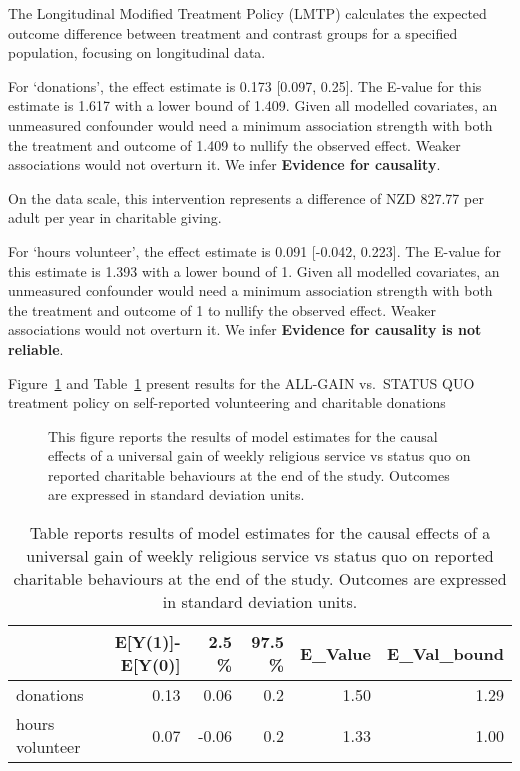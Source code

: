 \documentclass[
  single column]{article}
\begin{document}
The Longitudinal Modified Treatment Policy (LMTP) calculates the
expected outcome difference between treatment and contrast groups for a
specified population, focusing on longitudinal data.

For `donations', the effect estimate is 0.173 {[}0.097, 0.25{]}. The
E-value for this estimate is 1.617 with a lower bound of 1.409. Given
all modelled covariates, an unmeasured confounder would need a minimum
association strength with both the treatment and outcome of 1.409 to
nullify the observed effect. Weaker associations would not overturn it.
We infer \textbf{Evidence for causality}.

On the data scale, this intervention represents a difference of NZD
827.77 per adult per year in charitable giving.

For `hours volunteer', the effect estimate is 0.091 {[}-0.042, 0.223{]}.
The E-value for this estimate is 1.393 with a lower bound of 1. Given
all modelled covariates, an unmeasured confounder would need a minimum
association strength with both the treatment and outcome of 1 to nullify
the observed effect. Weaker associations would not overturn it. We infer
\textbf{Evidence for causality is not reliable}.

\newpage{}

Figure~\ref{fig-1_2} and Table~\ref{tbl-1_2} present results for the
ALL-GAIN vs.~STATUS QUO treatment policy on self-reported volunteering
and charitable donations

\begin{figure}


\caption{\label{fig-1_2}This figure reports the results of model
estimates for the causal effects of a universal gain of weekly religious
service vs status quo on reported charitable behaviours at the end of
the study. Outcomes are expressed in standard deviation units.}

\end{figure}%

\begin{longtable}[]{@{}lrrrrr@{}}

\caption{\label{tbl-1_2}Table reports results of model estimates for the
causal effects of a universal gain of weekly religious service vs status
quo on reported charitable behaviours at the end of the study. Outcomes
are expressed in standard deviation units.}

\tabularnewline

\toprule\noalign{}
& E{[}Y(1){]}-E{[}Y(0){]} & 2.5 \% & 97.5 \% & E\_Value &
E\_Val\_bound \\
\midrule\noalign{}
\endhead
\bottomrule\noalign{}
\endlastfoot
donations & 0.13 & 0.06 & 0.2 & 1.50 & 1.29 \\
hours volunteer & 0.07 & -0.06 & 0.2 & 1.33 & 1.00 \\

\end{longtable}
\end{document}
